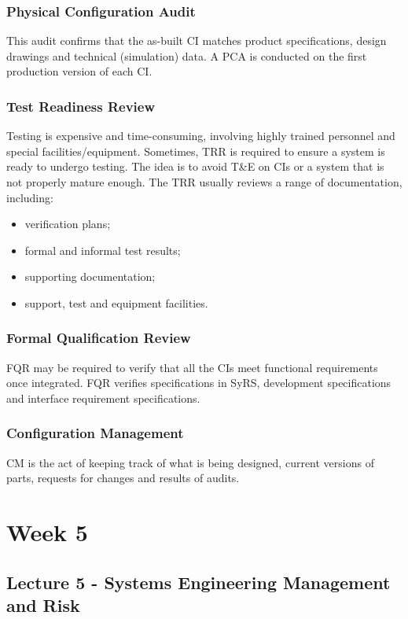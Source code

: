 \documentclass[journal]{IEEEtran}
\begin{document}
\subsubsection{\textbf{Physical Configuration Audit}}
This audit confirms that the as-built CI matches product specifications, design drawings and technical (simulation) data. A PCA is conducted on the first production version of each CI.
\subsubsection{\textbf{Test Readiness Review}}
Testing is expensive and time-consuming, involving highly trained personnel and special facilities/equipment. Sometimes, TRR is required to ensure a system is ready to undergo testing. The idea is to avoid T\&E on CIs or a system that is not properly mature enough. The TRR usually reviews a range of documentation, including:
\begin{itemize}
	\item verification plans;
	\item formal and informal test results;
	\item supporting documentation;
	\item support, test and equipment facilities.
\end{itemize}
\subsubsection{\textbf{Formal Qualification Review}}
FQR may be required to verify that all the CIs meet functional requirements once integrated. FQR verifies specifications in SyRS, development specifications and interface requirement specifications.
\subsubsection{\textbf{Configuration Management}}
CM is the act of keeping track of what is being designed, current versions of parts, requests for changes and results of audits.

\section{Week 5}
\subsection{\textbf{Lecture 5 - Systems Engineering Management and Risk}}
\end{document}

